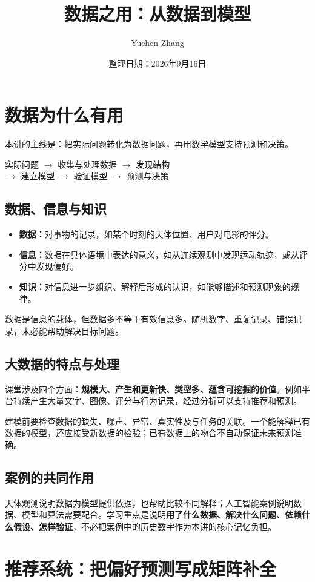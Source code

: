 \documentclass[UTF8,fontset=fandol,a4paper,12pt]{ctexart}
\title{数据之用：从数据到模型}
\author{Yuchen Zhang}
\date{整理日期：2026年9月16日}
\makeatletter
\theoremstyle{definition}
\renewcommand{\maketitle}{\begin{center}{\LARGE\bfseries\@title\par}\vspace{0.6em}\@author\par\vspace{0.2em}{\small\@date\par}\end{center}}
\makeatother
\begin{document}
\maketitle
\section{数据为什么有用}
本讲的主线是：把实际问题转化为数据问题，再用数学模型支持预测和决策。
\begin{center}
实际问题 $\longrightarrow$ 收集与处理数据 $\longrightarrow$ 发现结构\\[0.4em]
$\longrightarrow$ 建立模型 $\longrightarrow$ 验证模型 $\longrightarrow$ 预测与决策
\end{center}
\subsection{数据、信息与知识}
\begin{itemize}
\item \textbf{数据：}对事物的记录，如某个时刻的天体位置、用户对电影的评分。
\item \textbf{信息：}数据在具体语境中表达的意义，如从连续观测中发现运动轨迹，或从评分中发现偏好。
\item \textbf{知识：}对信息进一步组织、解释后形成的认识，如能够描述和预测现象的规律。
\end{itemize}
数据是信息的载体，但数据多不等于有效信息多。随机数字、重复记录、错误记录，未必能帮助解决目标问题。

\subsection{大数据的特点与处理}
课堂涉及四个方面：\textbf{规模大、产生和更新快、类型多、蕴含可挖掘的价值}。例如平台持续产生大量文字、图像、评分与行为记录，经过分析可以支持推荐和预测。

建模前要检查数据的缺失、噪声、异常、真实性及与任务的关联。一个能解释已有数据的模型，还应接受新数据的检验；已有数据上的吻合不自动保证未来预测准确。

\subsection{案例的共同作用}
天体观测说明数据为模型提供依据，也帮助比较不同解释；人工智能案例说明数据、模型和算法需要配合。学习重点是说明\textbf{用了什么数据、解决什么问题、依赖什么假设、怎样验证}，不必把案例中的历史数字作为本讲的核心记忆负担。

\newpage
\section{推荐系统：把偏好预测写成矩阵补全}
\end{document}
